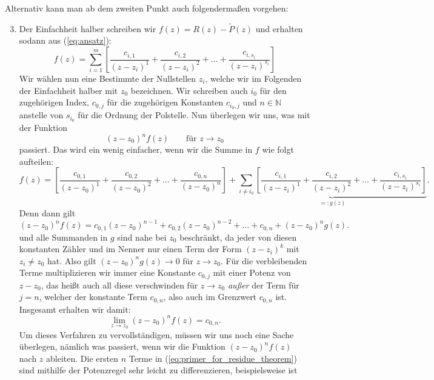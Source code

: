 \documentclass{article}
\theoremstyle{plain}
\theoremstyle{definition}
\begin{document}
Alternativ kann man ab dem zweiten Punkt auch folgendermaßen vorgehen:
\begin{enumerate}
	\setcounter{enumi}{2}
	\item Der Einfachheit halber schreiben wir $f(z) = R(z) - \tilde{P}(z)$ und erhalten sodann aus (\ref{eq:ansatz}):
	      \[
		      f(z) = \sum_{i = 1}^{m} \left[ \frac{c_{i, 1}}{(z - z_i)^1} + \frac{c_{i, 2}}{(z - z_i)^2} + \dots + \frac{c_{i, s_i}}{(z - z_i)^{s_i}} \right]
	      \]
	      Wir wählen nun eine Bestimmte der Nullstellen $z_i$, welche wir im Folgenden der Einfachheit halber mit $z_0$ bezeichnen.
	      Wir schreiben auch $i_0$ für den zugehörigen Index, $c_{0, j}$ für die zugehörigen Konstanten $c_{i_0, j}$ und $n \in \mathbb{N}$ anstelle von $s_{i_0}$ für die Ordnung der Polstelle.
	      Nun überlegen wir uns, was mit der Funktion
	      \[
		      (z - z_0)^{n} f(z) \qquad \text{für } z \to z_0
	      \]
	      passiert.
	      Das wird ein wenig einfacher, wenn wir die Summe in $f$ wie folgt aufteilen:
	      \[
		      f(z) = \left[ \frac{c_{0, 1}}{(z - z_0)^1} + \frac{c_{0, 2}}{(z - z_0)^2} + \dots + \frac{c_{0, n}}{(z - z_0)^{n}} \right] + \underbrace{\sum_{i \neq i_0} \left[ \frac{c_{i, 1}}{(z - z_i)^1} + \frac{c_{i, 2}}{(z - z_i)^2} + \dots + \frac{c_{i, s_i}}{(z - z_i)^{s_i}} \right]}_{=: g(z)}.
	      \]
	      Denn dann gilt
	      \begin{equation}\label{eq:primer_for_residue_theorem}
		      (z - z_0)^{n} f(z) = c_{0, 1} (z - z_0)^{n - 1} + c_{0, 2} (z - z_0)^{n - 2} + \dots + c_{0, n} + (z - z_0)^{n} g(z).
	      \end{equation}
	      und alle Summanden in $g$ sind nahe bei $z_0$ beschränkt, da jeder von diesen konstanten Zähler und im Nenner nur einen Term der Form $(z - z_i)^k$ mit $z_i \neq z_0$ hat. Also gilt $(z - z_0)^{n} g(z) \to 0$ für $z \to z_0$.
	      Für die verbleibenden Terme multiplizieren wir immer eine Konstante $c_{0, j}$ mit einer Potenz von $z - z_0$, das heißt auch all diese verschwinden für $z \to z_0$ \emph{außer} der Term für $j = n$, welcher der konstante Term $c_{0, n}$, also auch im Grenzwert $c_{0, n}$ ist.
	      Insgesamt erhalten wir damit:
	      \[
		      \lim_{z \to z_0} (z - z_0)^{n} f(z) = c_{0, n}.
	      \]
	      Um dieses Verfahren zu vervollständigen, müssen wir uns noch eine Sache überlegen, nämlich was passiert, wenn wir die Funktion $(z - z_0)^{n} f(z)$ nach $z$ ableiten.
	      Die ersten $n$ Terme in (\ref{eq:primer_for_residue_theorem}) sind mithilfe der Potenzregel sehr leicht zu differenzieren, beispielsweise ist

\end{enumerate}
\end{document}
